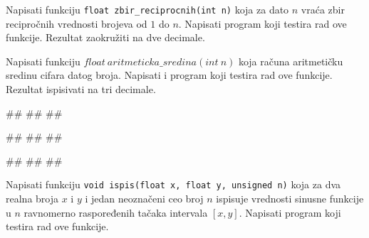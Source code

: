 \begin{Exercise}[label=v1.4_04] 
Napisati funkciju 
\verb|float zbir_reciprocnih(int n)|
koja za dato $n$ vraća zbir recipročnih vrednosti brojeva od $1$ do $n$.
Napisati program koji testira rad ove funkcije. Rezultat zaokružiti
na dve decimale.\\ 
\end{Exercise}
\begin{Answer}[ref=v1.4_04]
\end{Answer}

\begin{Exercise}[label=v1.4_05] 
 Napisati funkciju $float\ aritmeticka\_sredina(int\ n)$ koja računa aritmetičku sredinu cifara datog broja. Napisati i program koji testira rad ove funkcije. Rezultat ispisivati na tri decimale.
 
\begin{miditest}
\begin{upotreba}{1}
#\naslovInt#
##
##
\end{upotreba}
\end{miditest}
\begin{miditest}
\begin{upotreba}{2}
#\naslovInt#
##
##
\end{upotreba}
\end{miditest}

\begin{miditest}
\begin{upotreba}{3}
#\naslovInt#
##
##
\end{upotreba}
\end{miditest}
\end{Exercise}
\begin{Answer}[ref=v1.4_05]
\end{Answer}

\begin{Exercise}[label=v1.4_06] 
Napisati funkciju 
\verb|void ispis(float x, float y, unsigned n)|
koja za dva realna broja $x$ i $y$ i jedan neoznačeni ceo broj $n$
ispisuje vrednosti sinusne funkcije u $n$ ravnomerno raspoređenih tačaka intervala $[x,y]$.
Napisati program koji testira rad ove funkcije. \\ 
\end{Exercise}
\begin{Answer}[ref=v1.4_06]
\end{Answer}

